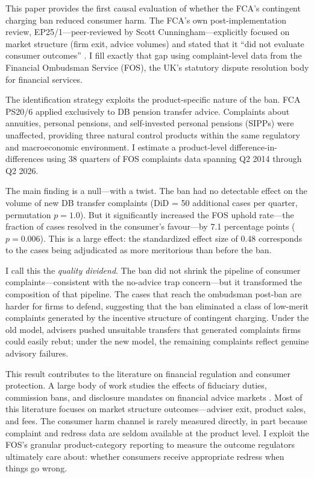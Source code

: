 \documentclass[12pt]{article}
\begin{document}
This paper provides the first causal evaluation of whether the FCA's contingent charging ban reduced consumer harm. The FCA's own post-implementation review, EP25/1---peer-reviewed by Scott Cunningham---explicitly focused on market structure (firm exit, advice volumes) and stated that it ``did not evaluate consumer outcomes'' \citep{fca2025ep251}. I fill exactly that gap using complaint-level data from the Financial Ombudsman Service (FOS), the UK's statutory dispute resolution body for financial services.

The identification strategy exploits the product-specific nature of the ban. FCA PS20/6 applied exclusively to DB pension transfer advice. Complaints about annuities, personal pensions, and self-invested personal pensions (SIPPs) were unaffected, providing three natural control products within the same regulatory and macroeconomic environment. I estimate a product-level difference-in-differences using 38 quarters of FOS complaints data spanning Q2 2014 through Q2 2026.

The main finding is a null---with a twist. The ban had no detectable effect on the volume of new DB transfer complaints (DiD = 50 additional cases per quarter, permutation $p = 1.0$). But it significantly increased the FOS uphold rate---the fraction of cases resolved in the consumer's favour---by 7.1 percentage points ($p = 0.006$). This is a large effect: the standardized effect size of 0.48 corresponds to the cases being adjudicated as more meritorious than before the ban.

I call this the \textit{quality dividend}. The ban did not shrink the pipeline of consumer complaints---consistent with the no-advice trap concern---but it transformed the composition of that pipeline. The cases that reach the ombudsman post-ban are harder for firms to defend, suggesting that the ban eliminated a class of low-merit complaints generated by the incentive structure of contingent charging. Under the old model, advisers pushed unsuitable transfers that generated complaints firms could easily rebut; under the new model, the remaining complaints reflect genuine advisory failures.

This result contributes to the literature on financial regulation and consumer protection. A large body of work studies the effects of fiduciary duties, commission bans, and disclosure mandates on financial advice markets \citep{inderst2012, egan2019, guiso2022, foerster2017}. Most of this literature focuses on market structure outcomes---adviser exit, product sales, and fees. The consumer harm channel is rarely measured directly, in part because complaint and redress data are seldom available at the product level. I exploit the FOS's granular product-category reporting to measure the outcome regulators ultimately care about: whether consumers receive appropriate redress when things go wrong.
\end{document}
